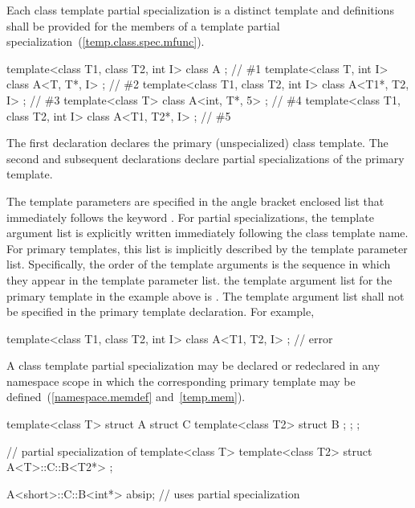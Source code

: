\pnum
Each class template partial specialization is a distinct template and
definitions shall be provided for the members of a template partial
specialization~(\ref{temp.class.spec.mfunc}).

\pnum
\enterexample
\begin{codeblock}
template<class T1, class T2, int I> class A             { };    // \#1
template<class T, int I>            class A<T, T*, I>   { };    // \#2
template<class T1, class T2, int I> class A<T1*, T2, I> { };    // \#3
template<class T>                   class A<int, T*, 5> { };    // \#4
template<class T1, class T2, int I> class A<T1, T2*, I> { };    // \#5
\end{codeblock}

The first declaration declares the primary (unspecialized) class template.
The second and subsequent declarations declare partial specializations of
the primary template.
\exitexample

\pnum
The template parameters are specified in the angle bracket enclosed list
that immediately follows the keyword
.
For partial specializations, the template argument list is explicitly
written immediately following the class template name.
For primary templates, this list is implicitly described by the
template parameter list.
Specifically, the order of the template arguments is the sequence in
which they appear in the template parameter list.
\enterexample
the template argument list for the primary template in the example
above is
.
\exitexample
\enternote
The template argument list shall not be specified in the primary template
declaration.
For example,

\begin{codeblock}
template<class T1, class T2, int I> class A<T1, T2, I>  { };    // error
\end{codeblock}
\exitnote

\pnum
A class template partial specialization may be declared or redeclared in any
namespace scope in which the corresponding primary template
may be defined~(\ref{namespace.memdef} and~\ref{temp.mem}).
\enterexample

\begin{codeblock}
template<class T> struct A {
  struct C {
    template<class T2> struct B { };
  };
};

// partial specialization of 
template<class T> template<class T2>
  struct A<T>::C::B<T2*> { };

A<short>::C::B<int*> absip;     // uses partial specialization
\end{codeblock}
\exitexample


